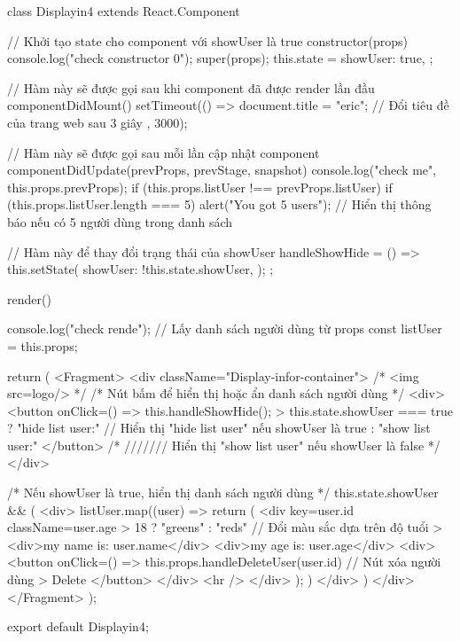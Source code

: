 class Displayin4 extends React.Component {
  // Khởi tạo state cho component với showUser là true
  constructor(props) {
    console.log("check constructor 0");
    super(props);
    this.state = {
      showUser: true,
    };
  }

  // Hàm này sẽ được gọi sau khi component đã được render lần đầu
  componentDidMount() {
    setTimeout(() => {
      document.title = "eric"; // Đổi tiêu đề của trang web sau 3 giây
    }, 3000);
  }

  // Hàm này sẽ được gọi sau mỗi lần cập nhật component
  componentDidUpdate(prevProps, prevStage, snapshot) {
    console.log("check me", this.props.prevProps);
    if (this.props.listUser !== prevProps.listUser) {
      if (this.props.listUser.length === 5) {
        alert("You got 5 users"); // Hiển thị thông báo nếu có 5 người dùng trong danh sách
      }
    }
  }

  // Hàm này để thay đổi trạng thái của showUser
  handleShowHide = () => {
    this.setState({
      showUser: !this.state.showUser,
    });
  };

  render() {
    console.log("check rende");
    // Lấy danh sách người dùng từ props
    const { listUser } = this.props;

    return (
      <Fragment>
        <div className="Display-infor-container">
          {/* <img src={logo}/> */}
          {/* Nút bấm để hiển thị hoặc ẩn danh sách người dùng */}
          <div>
            <button
              onClick={() => {
                this.handleShowHide();
              }}
            >
              {this.state.showUser === true
                ? "hide list user:" // Hiển thị "hide list user" nếu showUser là true
                : "show list user:"}
            </button>
            {/* /////// Hiển thị "show list user" nếu showUser là false */}
          </div>

          {/* Nếu showUser là true, hiển thị danh sách người dùng */}
          {this.state.showUser && (
            <div>
              {listUser.map((user) => {
                return (
                  <div
                    key={user.id}
                    className={user.age > 18 ? "greens" : "reds"} // Đổi màu sắc dựa trên độ tuổi
                  >
                    <div>my name is: {user.name}</div>
                    <div>my age is: {user.age}</div>
                    <div>
                      <button
                        onClick={() => this.props.handleDeleteUser(user.id)} // Nút xóa người dùng
                      >
                        Delete
                      </button>
                    </div>
                    <hr />
                  </div>
                );
              })}
            </div>
          )}
        </div>
      </Fragment>
    );
  }
}

export default Displayin4;
